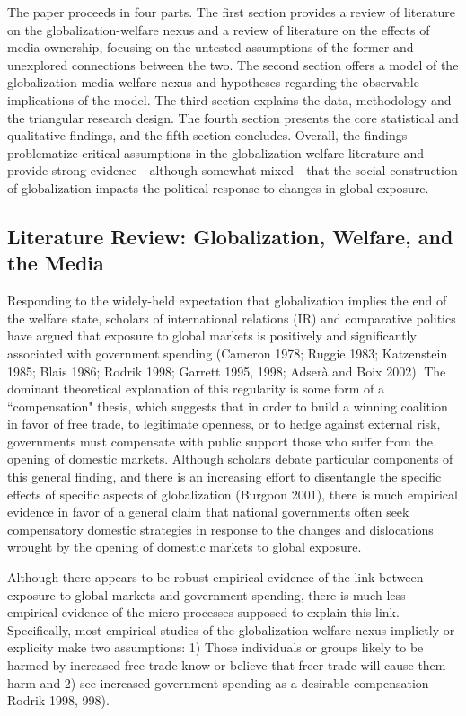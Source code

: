 \documentclass[12pt]{report}
\begin{document}
The paper proceeds in four parts. The first section provides a review of literature on the globalization-welfare nexus and a review of literature on the effects of media ownership, focusing on the untested assumptions of the former and unexplored connections between the two. The second section offers a model of the globalization-media-welfare nexus and hypotheses regarding the observable implications of the model. The third section explains the data, methodology and the triangular research design. The fourth section presents the core statistical and qualitative findings, and the fifth section concludes. Overall, the findings problematize critical assumptions in the globalization-welfare literature and provide strong evidence---although somewhat mixed---that the social construction of globalization impacts the political response to changes in global exposure.

\subsection{Literature Review: Globalization, Welfare, and the Media}

	Responding to the widely-held expectation that globalization implies the end of the welfare state, scholars of international relations (IR) and comparative politics have argued that exposure to global markets is positively and significantly associated with government spending (Cameron 1978; Ruggie 1983; Katzenstein 1985; Blais 1986; Rodrik 1998; Garrett 1995, 1998; Adserà and Boix 2002). The dominant theoretical explanation of this regularity is some form of a ``compensation" thesis, which suggests that in order to build a winning coalition in favor of free trade, to legitimate openness, or to hedge against external risk, governments must compensate with public support those who suffer from the opening of domestic markets. Although scholars debate particular components of this general finding, and there is an increasing effort to disentangle the specific effects of specific aspects of globalization (Burgoon 2001), there is much empirical evidence in favor of a general claim that national governments often seek compensatory domestic strategies in response to the changes and dislocations wrought by the opening of domestic markets to global exposure.
	
	Although there appears to be robust empirical evidence of the link between exposure to global markets and government spending, there is much less empirical evidence of the micro-processes supposed to explain this link. Specifically, most empirical studies of the globalization-welfare nexus implictly or explicity make two assumptions: 1) Those individuals or groups likely to be harmed by increased free trade know or believe that freer trade will cause them harm and 2) see increased government spending as a desirable compensation Rodrik 1998, 998).
	
\end{document}
